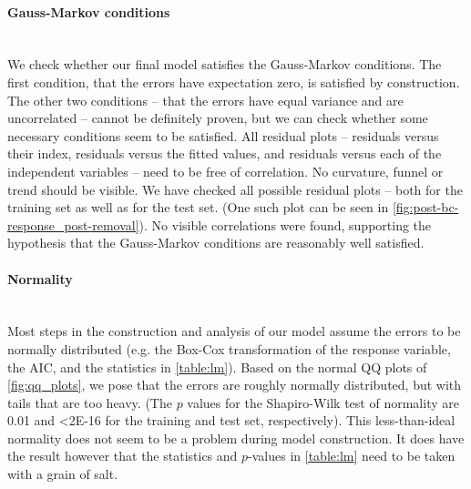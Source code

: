 \documentclass[a4paper, 12pt]{article}
\newcommand{\n}[1]{\num{#1}}
\begin{document}
\paragraph{Gauss-Markov conditions}\leavevmode\\
We check whether our final model satisfies the Gauss-Markov conditions. The first condition, that the errors have expectation zero, is satisfied by construction. The other two conditions -- that the errors have equal variance and are uncorrelated -- cannot be definitely proven, but we can check whether some necessary conditions seem to be satisfied. All residual plots -- residuals versus their index, residuals versus the fitted values, and residuals versus each of the independent variables -- need to be free of correlation. No curvature, funnel or trend should be visible. We have checked all possible residual plots -- both for the training set as well as for the test set. (One such plot can be seen in \cref{fig:post-bc-response_post-removal}). No visible correlations were found, supporting the hypothesis that the Gauss-Markov conditions are reasonably well satisfied.

\paragraph*{Normality}\leavevmode\\
Most steps in the construction and analysis of our model assume the errors to be normally distributed (e.g. the Box-Cox transformation of the response variable, the AIC, and the statistics in \cref{table:lm}). Based on the normal QQ plots of \cref{fig:qq_plots}, we pose that the errors are roughly normally distributed, but with tails that are too heavy. (The $p$ values for the Shapiro-Wilk test of normality are \n{0.01} and \n{<2E-16} for the training and test set, respectively). This less-than-ideal normality does not seem to be a problem during model construction. It does have the result however that the statistics and $p$-values in \cref{table:lm} need to be taken with a grain of salt.
\end{document}
